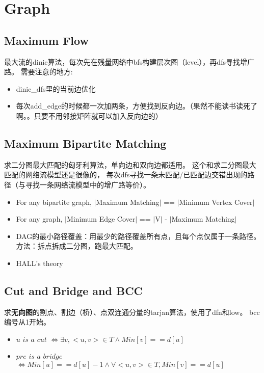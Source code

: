 \documentclass[twoside, UTF8]{article}
\begin{document}
	\section{Graph}
		\subsection{Maximum Flow}
			\begin{flushleft}
				最大流的dinic算法，每次先在残量网络中bfs构建层次图（level），再dfs寻找增广路。
				\linebreak 需要注意的地方:
				\begin{itemize}
					\item dinic\_dfs里的当前边优化
					\item 每次add\_edge的时候都一次加两条，方便找到反向边。（果然不能读书读死了啊。。只要不用邻接矩阵就可以加入反向边的）
				\end{itemize}
			\end{flushleft}
			
			
		\newpage
		\subsection{Maximum Bipartite Matching}
			\begin{flushleft}
				求二分图最大匹配的匈牙利算法，单向边和双向边都适用。
				\linebreak 这个和求二分图最大匹配的网络流模型还是很像的，
				\linebreak 每次dfs寻找一条未匹配/已匹配边交错出现的路径（与寻找一条网络流模型中的增广路等价）。
			\end{flushleft}
			\begin{itemize}
				\item For any bipartite graph, $|$Maximum Matching$|$ == $|$Minimum Vertex Cover$|$
				\item For any graph, $|$Minimum Edge Cover$|$ == $|$V$|$ - $|$Maximum Matching$|$
				\item DAG的最小路径覆盖：用最少的路径覆盖所有点，且每个点仅属于一条路径。方法：拆点拆成二分图，跑最大匹配。
				\item HALL's theory
			\end{itemize}
			
		\newpage
		\subsection{Cut and Bridge and BCC}
			\begin{flushleft}
				求\textbf{无向图}的割点、割边（桥）、点双连通分量的tarjan算法，使用了dfn和low。
				\linebreak bcc编号从1开始。
			\end{flushleft}
			
			\begin{itemize}
				\item $u$ $is$ $a$ $cut$ $\Leftrightarrow \exists v, <u, v> \in T \wedge Min[v] == d[u]$
				\item $pre$ $is$ $a$ $bridge$ $\Leftrightarrow Min[u] == d[u] - 1 \wedge \forall <u, v> \in T, Min[v] == d[u]$
			\end{itemize}
		\newpage
\end{document}
